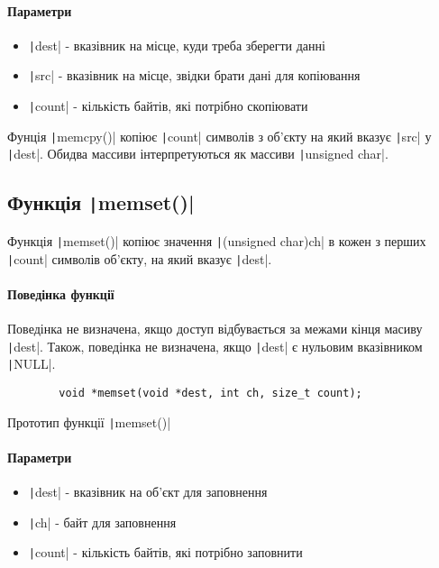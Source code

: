 \paragraph{Параметри}
\begin{itemize}
	\item \texttt|dest| - вказівник на місце, куди треба зберегти данні
	\item \texttt|src| - вказівник на місце, звідки брати дані для копіювання
	\item \texttt|count| - кількість байтів, які потрібно скопіювати
\end{itemize}
Фунція \texttt|memcpy()| копіює \texttt|count| символів з об'єкту на який  вказує \texttt|src| у \texttt|dest|. Обидва массиви інтерпретуються як массиви \texttt|unsigned char|.

\subsection[Функція \code{memset()}]{Функція \texttt|memset()|}
Функція \texttt|memset()| копіює значення \texttt|(unsigned char)ch| в кожен з перших \texttt|count| символів об'єкту, на який вказує \texttt|dest|.
\paragraph{Поведінка функції}
Поведінка не визначена, якщо доступ відбувається за межами кінця масиву \texttt|dest|. Також, поведінка не визначена, якщо \texttt|dest| є нульовим вказівником \texttt|NULL|.
\begin{listing}[H]
	\begin{verbatim}
		void *memset(void *dest, int ch, size_t count);
	\end{verbatim}
	\caption[Прототип ]{Прототип функції \texttt|memset()|}
	\label{lst:f:memset}
\end{listing}
\paragraph{Параметри}
\begin{itemize}
	\item \texttt|dest| - вказівник на об'єкт для заповнення
	\item \texttt|ch| - байт для заповнення
	\item \texttt|count| - кількість байтів, які потрібно заповнити
\end{itemize}

